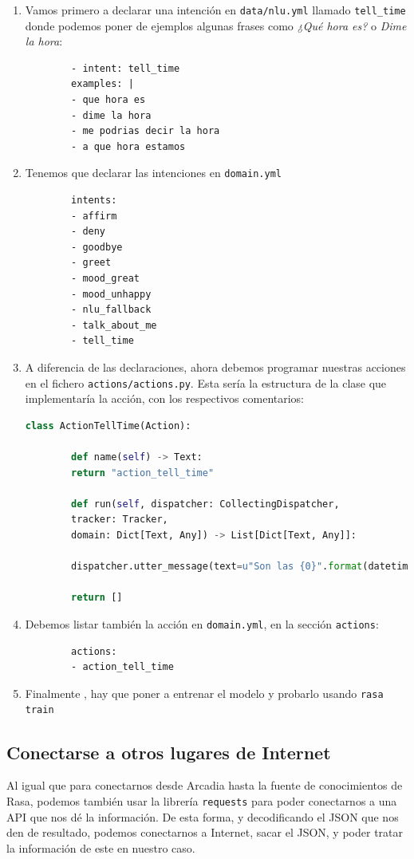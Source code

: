 \begin{enumerate}
	\item Vamos primero a declarar una intención en \texttt{data/nlu.yml} llamado \texttt{tell\_time} donde podemos poner de ejemplos algunas frases como \textit{¿Qué hora es?} o \textit{Dime la hora}:
	\begin{lstlisting}
		- intent: tell_time
		examples: |
		- que hora es
		- dime la hora
		- me podrias decir la hora
		- a que hora estamos
	\end{lstlisting}
	
	\item Tenemos que declarar las intenciones en \texttt{domain.yml}
	\begin{lstlisting}
		intents:
		- affirm
		- deny
		- goodbye
		- greet
		- mood_great
		- mood_unhappy
		- nlu_fallback
		- talk_about_me
		- tell_time
	\end{lstlisting}

	\item A diferencia de las declaraciones, ahora debemos programar nuestras acciones en el fichero \texttt{actions/actions.py}. Esta sería la estructura de la clase que implementaría la acción, con los respectivos comentarios:

	\begin{lstlisting}[language=Python]
		class ActionTellTime(Action):
		
		def name(self) -> Text:
		return "action_tell_time"
		
		def run(self, dispatcher: CollectingDispatcher,
		tracker: Tracker,
		domain: Dict[Text, Any]) -> List[Dict[Text, Any]]:
		
		dispatcher.utter_message(text=u"Son las {0}".format(datetime.datetime.now().strftime('%H horas y %M minutos')))
		
		return []
	\end{lstlisting}

	\item Debemos listar también la acción en \texttt{domain.yml}, en la sección \texttt{actions}:
	\begin{lstlisting}
		actions:
		- action_tell_time
	\end{lstlisting}
	
	\item Finalmente , hay que poner a entrenar el modelo y probarlo usando \texttt{rasa train}
\end{enumerate}

\subsection{Conectarse a otros lugares de Internet}
\label{subsection:7-3-4}
Al igual que para conectarnos desde Arcadia hasta la fuente de conocimientos de Rasa, podemos también usar la librería \texttt{requests} para poder conectarnos a una API que nos dé la información. De esta forma, y decodificando el JSON que nos den de resultado, podemos conectarnos a Internet, sacar el JSON, y poder tratar la información de este en nuestro caso.

